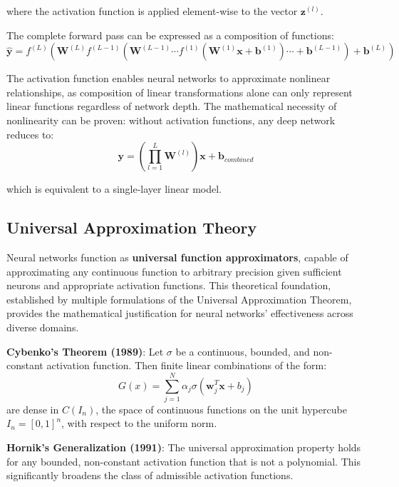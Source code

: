 \documentclass[11pt,a4paper]{report}
\begin{document}
where the activation function is applied element-wise to the vector $\mathbf{z}^{(l)}$.

The complete forward pass can be expressed as a composition of functions:
\begin{equation}
\hat{\mathbf{y}} = f^{(L)}(\mathbf{W}^{(L)} f^{(L-1)}(\mathbf{W}^{(L-1)} \cdots f^{(1)}(\mathbf{W}^{(1)} \mathbf{x} + \mathbf{b}^{(1)}) \cdots + \mathbf{b}^{(L-1)}) + \mathbf{b}^{(L)})
\end{equation}

The activation function enables neural networks to approximate nonlinear relationships, as composition of linear transformations alone can only represent linear functions regardless of network depth. The mathematical necessity of nonlinearity can be proven: without activation functions, any deep network reduces to:
\begin{equation}
\mathbf{y} = \left(\prod_{l=1}^{L} \mathbf{W}^{(l)}\right) \mathbf{x} + \mathbf{b}_{combined}
\end{equation}

which is equivalent to a single-layer linear model.

\subsection{Universal Approximation Theory}

Neural networks function as \textbf{universal function approximators}, capable of approximating any continuous function to arbitrary precision given sufficient neurons and appropriate activation functions. This theoretical foundation, established by multiple formulations of the Universal Approximation Theorem, provides the mathematical justification for neural networks' effectiveness across diverse domains.

\textbf{Cybenko's Theorem (1989)}: Let $\sigma$ be a continuous, bounded, and non-constant activation function. Then finite linear combinations of the form:
\begin{equation}
G(x) = \sum_{j=1}^{N} \alpha_j \sigma(\mathbf{w}_j^T \mathbf{x} + b_j)
\end{equation}
are dense in $C(I_n)$, the space of continuous functions on the unit hypercube $I_n = [0,1]^n$, with respect to the uniform norm.

\textbf{Hornik's Generalization (1991)}: The universal approximation property holds for any bounded, non-constant activation function that is not a polynomial. This significantly broadens the class of admissible activation functions.
\end{document}
